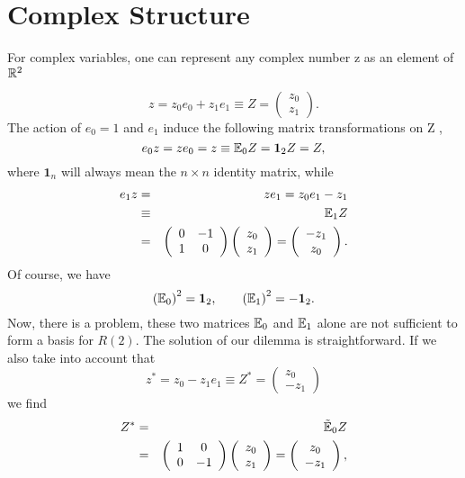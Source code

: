 \documentclass[a4paper,12pt]{book}
\begin{document}
\section{Complex Structure}

For complex variables, one can represent any complex number z as an element
of $\Bbb{R}^{2}$

\[
z=z_{0}e_{0}+z_{1}e_{1}\equiv Z=\left( 
\begin{array}{c}
z_{0} \\ 
z_{1}
\end{array}
\right) . 
\]
The action of $e_{0}=1$ and $e_{1}$ induce the following matrix
transformations on Z , 
\[
e_{0}z=ze_{0}=z\equiv \Bbb{E}_{0}Z=\mathbf{1}_{2}Z=Z, 
\]
where $\mathbf{1}_{n}$ will always mean the $n\times n$ identity matrix,
while 
\begin{eqnarray}
e_{1}z &=&ze_{1}=z_{0}e_{1}-z_{1} \\
&\equiv &\Bbb{E}_{1}Z \\
&=&\left( 
\begin{array}{cc}
0 & -1 \\ 
1 & 0
\end{array}
\right) \left( 
\begin{array}{c}
z_{0} \\ 
z_{1}
\end{array}
\right) =\left( 
\begin{array}{c}
-z_{1} \\ 
z_{0}
\end{array}
\right) .
\end{eqnarray}
Of course, we have 
\begin{equation}
\left( \Bbb{E}_{0}\right) ^{2}=\mathbf{1}_{2},\quad \quad \left( \Bbb{E}%
_{1}\right) ^{2}=-\mathbf{1}_{2}.
\end{equation}
Now, there is a problem, these two matrices $\Bbb{E}_{0}$ and $\Bbb{E}_{1}$
alone are not sufficient to form a basis for $R(2)$. The solution of our
dilemma is straightforward. If we also take into account that 
\[
z^{*}=z_{0}-z_{1}e_{1}\equiv Z^{*}=\left( 
\begin{array}{c}
z_{0} \\ 
-z_{1}
\end{array}
\right) 
\]
we find 
\begin{eqnarray}
Z^{*} &=&{\tilde{\Bbb{E}}}_{0}Z \\
&=&\left( 
\begin{array}{cc}
1 & 0 \\ 
0 & -1
\end{array}
\right) \left( 
\begin{array}{c}
z_{0} \\ 
z_{1}
\end{array}
\right) =\left( 
\begin{array}{c}
z_{0} \\ 
-z_{1}
\end{array}
\right) ,
\end{eqnarray}
\end{document}
